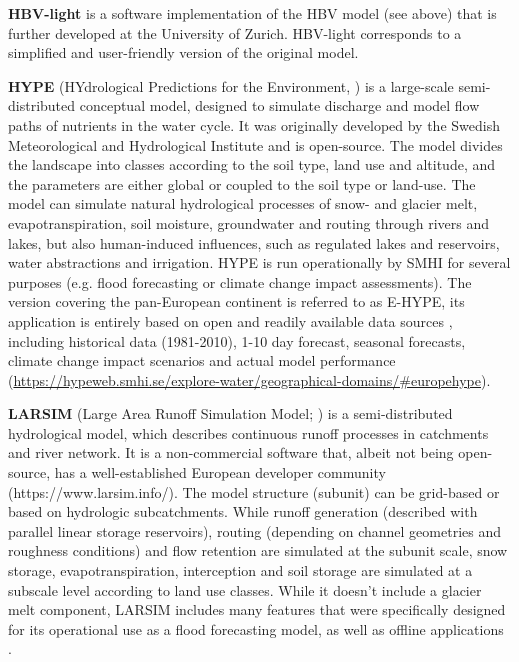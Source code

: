\documentclass[10pt,a4paper]{article}
\begin{document}
\textbf{HBV-light} \citep{Seibert2012} is a software implementation of the HBV model (see above) that is further developed at the University of Zurich. HBV-light corresponds to a simplified and user-friendly version of the original model. 

\textbf{HYPE} (HYdrological Predictions for the Environment, \citealp{Lindstrom2010}) is a large-scale semi-distributed conceptual model, designed to simulate discharge and model flow paths of nutrients in the water cycle. It was originally developed by the Swedish Meteorological and Hydrological Institute and is open-source. The model divides the landscape into classes according to the soil type, land use and altitude, and the parameters are either global or coupled to the soil type or land-use. The model can simulate natural hydrological processes of snow- and glacier melt, evapotranspiration, soil moisture, groundwater and routing through rivers and lakes, but also human-induced influences, such as regulated lakes and reservoirs, water abstractions and irrigation. HYPE is run operationally by SMHI for several purposes (e.g. flood forecasting or climate change impact assessments). The version covering the pan-European continent is referred to as E-HYPE, its application is entirely based on open and readily available data sources \citep{Donnelly2015}, including historical data (1981-2010), 1-10 day forecast, seasonal forecasts, climate change impact scenarios and actual model performance (\url{https://hypeweb.smhi.se/explore-water/geographical-domains/\#europehype}).

\textbf{LARSIM} (Large Area Runoff Simulation Model; \citealp{Ludwig2006}) is a semi-distributed hydrological model, which describes continuous runoff processes in catchments and river network. It is a non-commercial software that, albeit not being open-source, has a well-established European developer community (https://www.larsim.info/). The model structure (subunit) can be grid-based or based on hydrologic subcatchments. While runoff generation (described with parallel linear storage reservoirs), routing (depending on channel geometries and roughness conditions) and flow retention are simulated at the subunit scale, snow storage, evapotranspiration, interception and soil storage are simulated at a subscale level according to land use classes. While it doesn't include a glacier melt component, LARSIM includes many features that were specifically designed for its operational use as a flood forecasting model, as well as offline applications \citep{Stahl2017}. 
\end{document}
